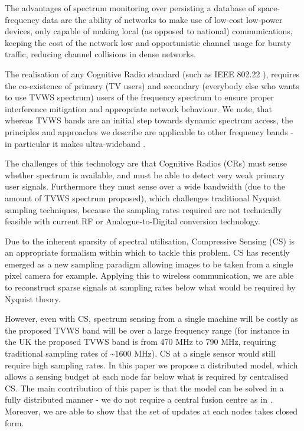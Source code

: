 \documentclass{article}
\begin{document}
The advantages of spectrum monitoring \cite{akan2009cognitive} over persisting a database of space-frequency data are the ability of networks to make use of low-cost low-power devices, only capable of making local (as opposed to national) communications, keeping the cost of the network low and  opportunistic channel usage for bursty traffic, reducing channel collisions in dense networks.

The realisation of any Cognitive Radio standard (such as IEEE 802.22 \cite{stevenson2009ieee}), requires the co-existence of primary (TV users) and secondary (everybody else who wants to use TVWS spectrum) users of the frequency spectrum to ensure proper interference mitigation and appropriate network behaviour. We note, that whereas TVWS bands are an initial step towards dynamic spectrum access, the principles and approaches we describe are applicable to other frequency bands - in particular it makes ultra-wideband .

The challenges of this technology are that Cognitive Radios (CRs) must sense whether spectrum is available, and must be able to detect very weak primary user signals. Furthermore they must sense over a wide bandwidth (due to the amount of TVWS spectrum proposed), which challenges traditional Nyquist sampling techniques, because the sampling rates required are not technically feasible with current RF or Analogue-to-Digital conversion technology.

Due to the inherent sparsity of spectral utilisation, Compressive Sensing (CS) \cite{Candes2006} is an appropriate formalism within which to tackle this problem. CS has recently emerged as a new sampling paradigm allowing images to be taken from a single pixel camera for example. Applying this to wireless communication, we are able to reconstruct sparse signals at sampling rates below what would be required by Nyquist theory. 

However, even with CS, spectrum sensing from a single machine will be costly as the proposed TVWS band will be over a large frequency range (for instance in the UK the proposed TVWS band is from 470 MHz to 790 MHz, requiring traditional sampling rates of \textasciitilde 1600 MHz). CS at a single sensor would still require high sampling rates. In this paper we propose a distributed model, which allows a sensing budget at each node far below what is required by centralised CS. The main contribution of this paper is that the model can be solved in a fully distributed manner - we do not require a central fusion centre as in \cite{Zhang2011b}. Moreover, we are able to show that the set of updates at each nodes takes closed form.
\end{document}
